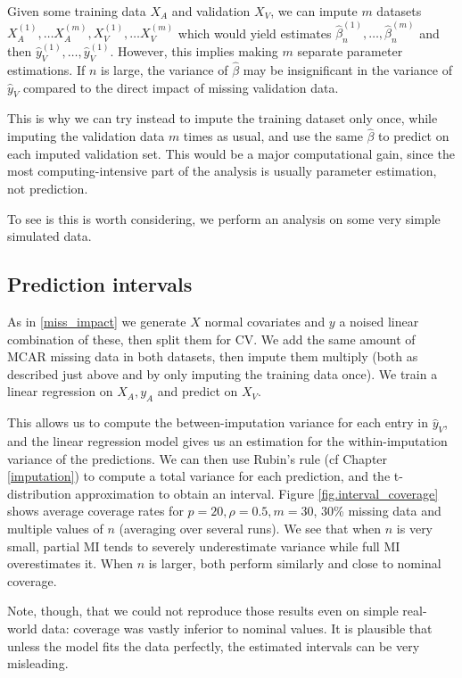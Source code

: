 		 Given some training data $X_A$ and validation $X_V$, we can impute $m$ datasets $X_A^{(1)}, \ldots X_A^{(m)}, X_V^{(1)}, \ldots X_V^{(m)}$ which would yield estimates $\hat{\beta}_n^{(1)}, \ldots, \hat{\beta}_n^{(m)}$ and then $\hat{y}_V^{(1)}, \ldots, \hat{y}_V^{(1)}$. However, this implies making $m$ separate parameter estimations. If $n$ is large, the variance of $\hat{\beta}$ may be insignificant in the variance of $\hat{y}_V$ compared to the direct impact of missing validation data. 
		 
		 This is why we can try instead to impute the training dataset only once, while imputing the validation data $m$ times as usual, and use the same $\hat{\beta}$ to predict on each imputed validation set. This would be a major computational gain, since the most computing-intensive part of the analysis is usually parameter estimation, not prediction.

To see is this is worth considering, we perform an analysis on some very simple simulated data.

		\subsection{Prediction intervals}
As in \ref{miss_impact} we generate $X$ normal covariates and $y$ a noised linear combination of these, then split them for CV. We add the same amount of MCAR missing data in both datasets, then impute them multiply (both as described just above and by only imputing the training data once). We train a linear regression on $X_A, y_A$ and predict on $X_V$.

This allows us to compute the between-imputation variance for each entry in $\hat{y}_V$, and the linear regression model gives us an estimation for the within-imputation variance of the predictions. We can then use Rubin's rule (cf Chapter \ref{imputation}) to compute a total variance for each prediction, and the t-distribution approximation to obtain an interval. 
Figure \ref{fig.interval_coverage} shows average coverage rates for $p=20, \rho=0.5, m=30$, $30$\% missing data and multiple values of $n$ (averaging over several runs). We see that when $n$ is very small, partial MI tends to severely underestimate variance while full MI overestimates it. When $n$ is larger, both perform similarly and close to nominal coverage. 

Note, though, that we could not reproduce those results even on simple real-world data: coverage was vastly inferior to nominal values. It is plausible that unless the model fits the data perfectly, the estimated intervals can be very misleading. 


